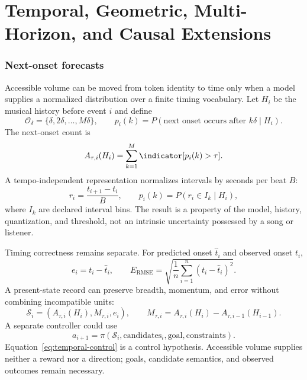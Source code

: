 \clearpage
\part{Temporal, Geometric, Multi-Horizon, and Causal Extensions}

\section{Next-onset forecasts}
Accessible volume can be moved from token identity to time only when a model supplies a normalized distribution over a finite timing vocabulary. Let $H_i$ be the musical history before event $i$ and define
\begin{equation}
\mathcal O_\delta=\{\delta,2\delta,\ldots,M\delta\},\qquad
p_i(k)=P(\text{next onset occurs after }k\delta\mid H_i).
\end{equation}
The next-onset count is
\begin{equation}
A_{\tau,i}(H_i)=\sum_{k=1}^{M}\indicator[p_i(k)>\tau].
\label{eq:onset-volume}
\end{equation}
A tempo-independent representation normalizes intervals by seconds per beat $B$:
\begin{equation}
r_i=\frac{t_{i+1}-t_i}{B},\qquad p_i(k)=P(r_i\in I_k\mid H_i),
\label{eq:normalized-interval}
\end{equation}
where $I_k$ are declared interval bins. The result is a property of the model, history, quantization, and threshold, not an intrinsic uncertainty possessed by a song or listener.

Timing correctness remains separate. For predicted onset $\hat t_i$ and observed onset $t_i$,
\begin{equation}
e_i=t_i-\hat t_i,\qquad
E_{\mathrm{RMSE}}=\sqrt{\frac1n\sum_{i=1}^{n}(t_i-\hat t_i)^2}.
\label{eq:timing-error}
\end{equation}
A present-state record can preserve breadth, momentum, and error without combining incompatible units:
\begin{equation}
\mathcal S_i=(A_{\tau,i}(H_i),M_{\tau,i},e_i),\qquad
M_{\tau,i}=A_{\tau,i}(H_i)-A_{\tau,i-1}(H_{i-1}).
\end{equation}
A separate controller could use
\begin{equation}
a_{i+1}=\pi(\mathcal S_i,\text{candidates}_i,\text{goal},\text{constraints}).
\label{eq:temporal-control}
\end{equation}
Equation~\eqref{eq:temporal-control} is a control hypothesis. Accessible volume supplies neither a reward nor a direction; goals, candidate semantics, and observed outcomes remain necessary.

